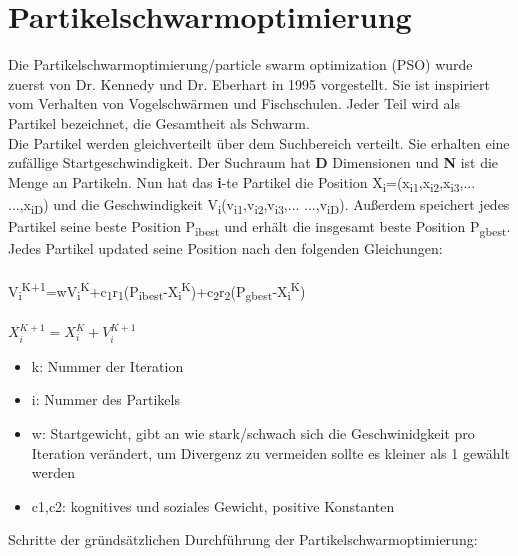 \section{Partikelschwarmoptimierung}
Die Partikelschwarmoptimierung/particle swarm optimization (PSO) wurde zuerst von Dr. Kennedy und Dr. Eberhart in 1995 vorgestellt\cite{kennedy1942particle}.
 Sie ist inspiriert vom Verhalten von Vogelschwärmen und Fischschulen. Jeder Teil wird als Partikel bezeichnet, die Gesamtheit als Schwarm.
\\ Die Partikel werden gleichverteilt über dem Suchbereich verteilt. Sie erhalten eine zufällige Startgeschwindigkeit. 
Der Suchraum hat \textbf{D} Dimensionen und \textbf{N} ist die Menge an Partikeln. Nun hat das \textbf{i}-te Partikel die Position X\textsubscript{i}=(x\textsubscript{i1},x\textsubscript{i2},x\textsubscript{i3},... ...,x\textsubscript{iD})
  und die Geschwindigkeit V\textsubscript{i}(v\textsubscript{i1},v\textsubscript{i2},v\textsubscript{i3},... ...,v\textsubscript{iD}). Außerdem speichert jedes Partikel seine beste Position P\textsubscript{ibest} und erhält die insgesamt beste Position P\textsubscript{gbest}. 
\\
Jedes Partikel updated seine Position nach den folgenden Gleichungen:\\\\
\large V\textsubscript{i}\textsuperscript{K+1}=wV\textsubscript{i}\textsuperscript{K}+c\textsubscript{1}r\textsubscript{1}(P\textsubscript{ibest}-X\textsubscript{i}\textsuperscript{K})+c\textsubscript{2}r\textsubscript{2}(P\textsubscript{gbest}-X\textsubscript{i}\textsuperscript{K})\\\\\normalsize
$X_i^{K+1}=X_i^K+V_i^{K+1}$
\begin{itemize}

  \item k: Nummer der Iteration
  \item i: Nummer des Partikels
  \item w: Startgewicht, gibt an wie stark/schwach sich die Geschwinidgkeit pro Iteration verändert, um Divergenz zu vermeiden sollte es  kleiner als 1 gewählt werden
  \item c1,c2: kognitives und soziales Gewicht, positive Konstanten

\end{itemize}
Schritte der gründsätzlichen Durchführung der Partikelschwarmoptimierung:
